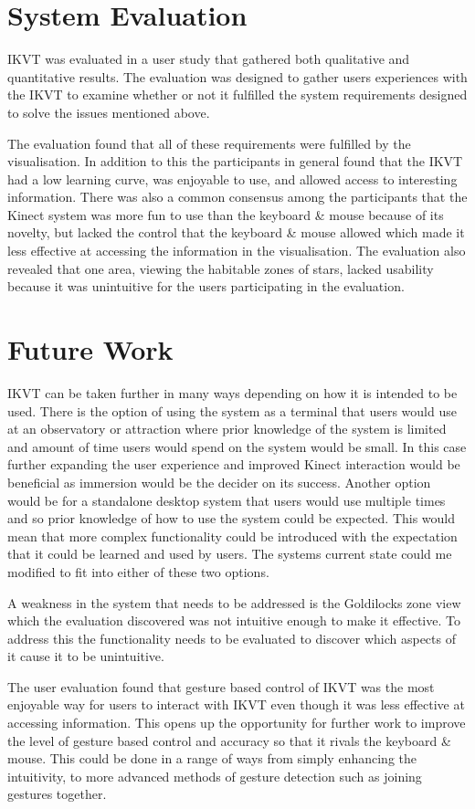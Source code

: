 \section{System Evaluation}
IKVT was evaluated in a user study that gathered both qualitative and quantitative
results. The evaluation was designed to gather users experiences with the IKVT
to examine whether or not it fulfilled the system requirements designed to solve
the issues mentioned above.

The evaluation found that all of these requirements were fulfilled by the
visualisation. In addition to this the participants in general found that the
IKVT had a low learning curve, was enjoyable to use, and allowed
access to interesting information. There was also a common consensus among the
participants that the Kinect system was more fun to use than the keyboard \&
mouse because of its novelty, but lacked the control that the
keyboard \& mouse allowed which made it less effective at accessing the
information in the visualisation. The evaluation also revealed that one area,
viewing the habitable zones of stars, lacked
usability because it was unintuitive for the users participating in the evaluation.     
\section{Future Work}
IKVT  can be taken further in many ways depending
on how it is intended to be used. There is the option of using the system as a
terminal that users would use at an observatory or attraction where prior
knowledge of the system is limited and amount of time users would spend on the
system would be small. In this case further expanding the user experience and
improved Kinect interaction would be beneficial as immersion would be the
decider on its success. Another option would be for a standalone
desktop system that users would use multiple times and so prior knowledge of how
to use the system could be expected. This would mean that more complex
functionality could be introduced with the expectation that it could be learned and used by
users. The systems current state could me modified to fit into either of these
two options.

A weakness in the system that needs to be addressed is the Goldilocks zone view
which the evaluation discovered was not intuitive enough to make it effective. To
address this the functionality needs to be evaluated to discover which aspects
of it cause it to be unintuitive.

The user evaluation found that gesture based control of IKVT was the most
enjoyable way for users to interact with IKVT even though it was less effective
at accessing information. This opens up the opportunity for further work to
improve the level of gesture based control and accuracy so that it rivals the
keyboard \& mouse. This could be done in a range of ways from simply enhancing
the intuitivity, to more advanced methods of gesture detection such as joining gestures together.

